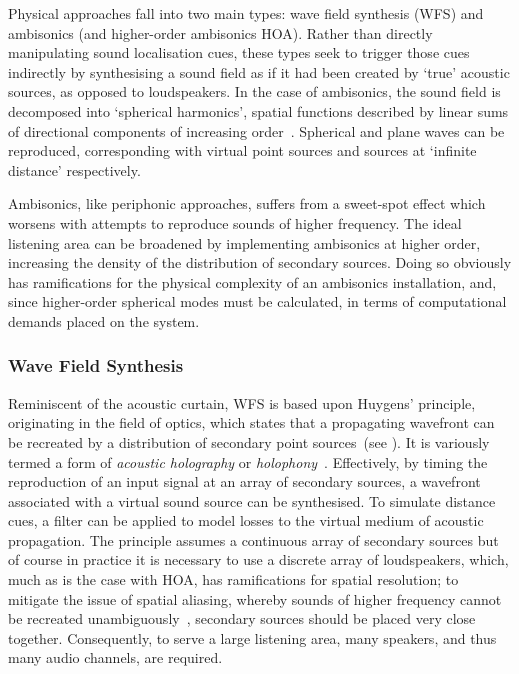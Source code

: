 Physical approaches fall into two main types: wave field synthesis (WFS) and
ambisonics (and higher-order ambisonics \textemdash{} HOA). Rather than
directly manipulating sound localisation cues, these types seek to trigger
those cues indirectly by synthesising a sound field as if it had been created
by `true' acoustic sources, as opposed to loudspeakers.
In the case of ambisonics, the sound field is decomposed into `spherical
harmonics', spatial functions described by linear sums of directional
components of increasing order~\citep{nicol_sound_2017}.
Spherical and plane waves can be reproduced, corresponding with virtual
point sources and sources at `infinite distance' respectively.

Ambisonics, like periphonic approaches, suffers from a sweet-spot effect which
worsens with attempts to reproduce sounds of higher frequency.
The ideal listening area can be broadened by implementing ambisonics at higher
order, increasing the density of the distribution of secondary sources.
Doing so obviously has ramifications for the physical complexity of an
ambisonics installation, and, since higher-order spherical modes must be
calculated, in terms of computational demands placed on the system.

\subsubsection{Wave Field Synthesis}

Reminiscent of the acoustic curtain, WFS is based upon Huygens' principle,
originating in the field of optics, which states that a propagating
wavefront can be recreated by a distribution of secondary point
sources~\citep{mueller_acoustic_1971,berkhout_acoustic_1993,
    belloch_performance_2021}(see ).
It is variously termed a form of \textit{acoustic holography} or
\textit{holophony}~\citep{berkhout_holographic_1988,ahrens_analytic_2012}.
Effectively, by timing the reproduction of an input signal at an array of
secondary sources, a wavefront associated with a virtual sound source can be
synthesised.
To simulate distance cues, a filter can be applied to model losses to the
virtual medium of acoustic propagation.
The principle assumes a continuous array of secondary sources but of course in
practice it is necessary to use a discrete array of loudspeakers, which,
much as is the case with HOA, has ramifications for spatial resolution;
to mitigate the issue of spatial aliasing, whereby sounds of higher frequency
cannot be recreated unambiguously~\citep{winter_geometric_2018},
secondary sources should be placed very close together.
Consequently, to serve a large listening area, many speakers, and thus many
audio channels, are required.

